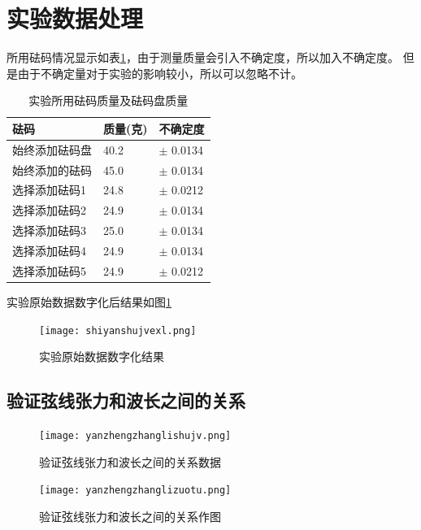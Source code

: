 \documentclass{ctexart}
\begin{document}
\section{实验数据处理}
所用砝码情况显示如表\ref{famazhiliang}，由于测量质量会引入不确定度，所以加入不确定度。
但是由于不确定量对于实验的影响较小，所以可以忽略不计。
\begin{table}[h]
  \centering   
  \caption{实验所用砝码质量及砝码盘质量}\label{famazhiliang}
  \begin{tabular}{| l || l || l |}
      \hline
      砝码 & 质量(克) & 不确定度\\
      \hline
      始终添加砝码盘 & 40.2 & $\pm$ 0.0134\\
      \hline
      始终添加的砝码 & 45.0 & $\pm$ 0.0134\\
      \hline
      选择添加砝码1 & 24.8 & $\pm$ 0.0212\\
      \hline
      选择添加砝码2 & 24.9 & $\pm$ 0.0134\\
      \hline
      选择添加砝码3 & 25.0 & $\pm$ 0.0134\\
      \hline
      选择添加砝码4 & 24.9 & $\pm$ 0.0134\\
      \hline
      选择添加砝码5 & 24.9 & $\pm$ 0.0212\\
      \hline                       
  \end{tabular}
\end{table}

实验原始数据数字化后结果如图\ref{shiyanshujvexl}
\begin{figure}[h]
  \centering
  \texttt{[image: shiyanshujvexl.png]}
  \caption{实验原始数据数字化结果}\label{shiyanshujvexl}
\end{figure}

  \subsection{验证弦线张力和波长之间的关系}
  \begin{figure}[b]
    \centering
    \begin{minipage}[b]{0.48\textwidth}
      \centering
      \texttt{[image: yanzhengzhanglishujv.png]}
      \caption{验证弦线张力和波长之间的关系数据}\label{yanzhengzhanglishujv}
    \end{minipage}
    \begin{minipage}[b]{0.48\textwidth}
      \centering
      \texttt{[image: yanzhengzhanglizuotu.png]}
      \caption{验证弦线张力和波长之间的关系作图}\label{yanzhengzhanglizuotu}
    \end{minipage}
  \end{figure}
\end{document}

